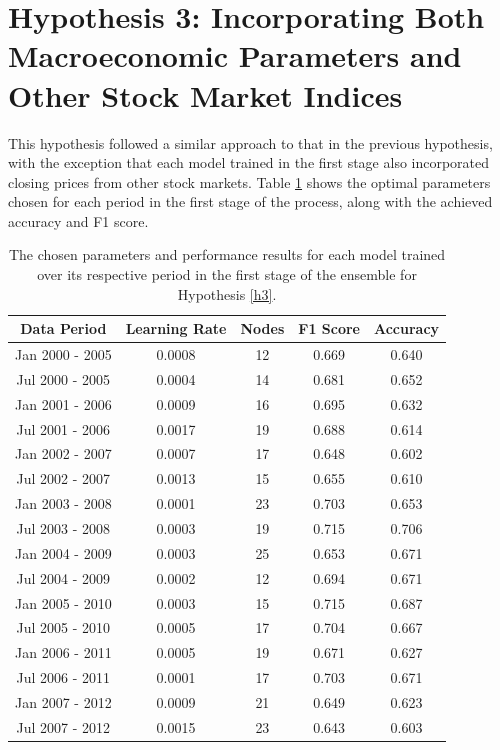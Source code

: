 \documentclass{UoYCSproject}
\begin{document}
\section{Hypothesis 3: Incorporating Both Macroeconomic Parameters and Other Stock Market Indices}
This hypothesis followed a similar approach to that in the previous hypothesis, with the exception that each model trained in the first stage also incorporated closing prices from other stock markets. Table \ref{tab:h3_stage1} shows the optimal parameters chosen for each period in the first stage of the process, along with the achieved accuracy and F1 score. 


\begin{table}[h]
    \centering
    \begin{tabular}{|c|c|c|c|c|} \hline
        \textbf{Data Period} & \textbf{Learning Rate} & \textbf{Nodes} & \textbf{F1 Score} & \textbf{Accuracy} \\ \hline
        Jan 2000 - 2005 & 0.0008 & 12 & 0.669 & 0.640\\
        Jul 2000 - 2005 & 0.0004 & 14 & 0.681 & 0.652\\
        Jan 2001 - 2006 & 0.0009 & 16 & 0.695 & 0.632\\
        Jul 2001 - 2006 & 0.0017 & 19 & 0.688 & 0.614\\
        Jan 2002 - 2007 & 0.0007 & 17 & 0.648 & 0.602\\
        Jul 2002 - 2007 & 0.0013 & 15 & 0.655 & 0.610\\
        Jan 2003 - 2008 & 0.0001 & 23 & 0.703 & 0.653\\
        Jul 2003 - 2008 & 0.0003 & 19 & 0.715 & 0.706\\
        Jan 2004 - 2009 & 0.0003 & 25 & 0.653 & 0.671\\
        Jul 2004 - 2009 & 0.0002 & 12 & 0.694 & 0.671\\
        Jan 2005 - 2010 & 0.0003 & 15 & 0.715 & 0.687\\
        Jul 2005 - 2010 & 0.0005 & 17 & 0.704 & 0.667\\
        Jan 2006 - 2011 & 0.0005 & 19 & 0.671 & 0.627\\
        Jul 2006 - 2011 & 0.0001 & 17 & 0.703 & 0.671\\
        Jan 2007 - 2012 & 0.0009 & 21 & 0.649 & 0.623\\
        Jul 2007 - 2012 & 0.0015 & 23 & 0.643 & 0.603\\
        \hline
    \end{tabular}
    \caption{The chosen parameters and performance results for each model trained over its respective period in the first stage of the ensemble for Hypothesis \ref{h3}.}
    \label{tab:h3_stage1}
\end{table}
\end{document}
